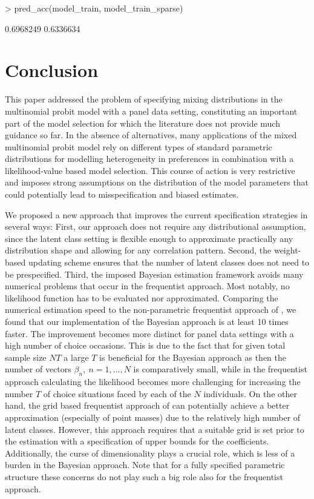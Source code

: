 \documentclass[article]{jss}
\begin{document}
\begin{Schunk}
\begin{Sinput}
> pred_acc(model_train, model_train_sparse)
\end{Sinput}
\begin{Soutput}
[1] 0.6968249 0.6336634
\end{Soutput}
\end{Schunk}

\section{Conclusion} \label{sec:conclusion}

This paper addressed the problem of specifying mixing distributions in the multinomial probit model with a panel data setting, constituting an important part of the model selection for which the literature does not provide much guidance so far. In the absence of alternatives, many applications of the mixed multinomial probit model rely on different types of standard parametric distributions for modelling heterogeneity in preferences in combination with a likelihood-value based model selection. This course of action is very restrictive and imposes strong assumptions on the distribution of the model parameters that could potentially lead to misspecification and biased estimates.

We proposed a new approach that improves the current specification strategies in several ways: First, our approach does not require any distributional assumption, since the latent class setting is flexible enough to approximate practically any distribution shape and allowing for any correlation pattern. Second, the weight-based updating scheme ensures that the number of latent classes does not need to be prespecified. Third, the imposed Bayesian estimation framework avoids many numerical problems that occur in the frequentist approach. Most notably, no likelihood function has to be evaluated nor approximated. Comparing the numerical estimation speed to the non-parametric frequentist approach of \cite{Bauer:2019}, we found that our implementation of the Bayesian approach is at least 10 times faster. The improvement becomes more distinct for panel data settings with a high number of choice occasions. This is due to the fact that for given total sample size $NT$ a large $T$ is beneficial for the Bayesian approach as then the number of vectors $\beta_n,~ n = 1,...,N$ is comparatively small, while in the frequentist approach calculating the likelihood becomes more challenging for increasing the number $T$ of choice situations faced by each of the $N$ individuals. On the other hand, the grid based frequentist approach of \cite{Bauer:2019} can potentially achieve a better approximation (especially of point masses) due to the relatively high number of latent classes. However, this approach requires that a suitable grid is set prior to the estimation with a specification of upper bounds for the coefficients. Additionally, the curse of dimensionality plays a crucial role, which is less of a burden in the Bayesian approach. Note that for a fully specified parametric structure these concerns do not play such a big role also for the frequentist approach.
\end{document}
